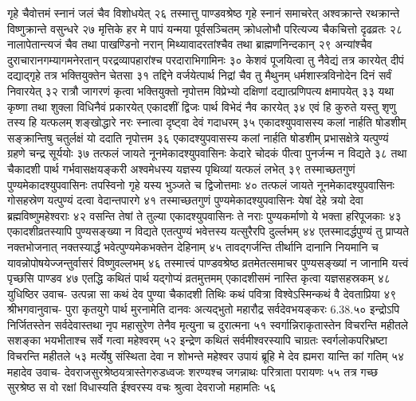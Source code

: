 गृहे चैवोत्तमं स्नानं जलं चैव विशोधयेत् २६
तस्मात्तु पाण्डवश्रेष्ठ गृहे स्नानं समाचरेत् 
अश्वक्रान्ते रथक्रान्ते विष्णुक्रान्ते वसुन्धरे २७
मृत्तिके हर मे पापं यन्मया पूर्वसञ्चितम् 
क्रोधलोभौ परित्यज्य चैकचित्तो दृढव्रतः २८
नालापेतान्त्यजं चैव तथा पाखण्डिनो नरान् 
मिथ्यावादरतांश्चैव तथा ब्राह्मणनिन्दकान् २९
अन्यांश्चैव दुराचारानगम्यागमनेरतान् 
परद्रव्यापहारांश्च परदाराभिगामिनः ३०
केशवं पूजयित्वा तु नैवेद्यं तत्र कारयेत् 
दीपं दद्याद्गृहे तत्र भक्तियुक्तेन चेतसा ३१
तद्दिने वर्जयेत्पार्थ निद्रां चैव तु मैथुनम् 
धर्मशास्त्रविनोदेन दिनं सर्वं निवारयेत् ३२
रात्रौ जागरणं कृत्वा भक्तियुक्तो नृपोत्तम 
विप्रेभ्यो दक्षिणां दद्यात्प्रणिपत्य क्षमापयेत् ३३
यथा कृष्णा तथा शुक्ला विधिनैवं प्रकारयेत् 
एकादशीं द्विजः पार्थ विभेदं नैव कारयेत् ३४
एवं हि कुरुते यस्तु शृणु तस्य हि यत्फलम् 
शङ्खोद्धारे नरः स्नात्वा दृष्ट्वा देवं गदाधरम् ३५
एकादश्युपवासस्य कलां नार्हति षोडशीम् 
सङ्क्रान्तिषु चतुर्लक्षं यो ददाति नृपोत्तम ३६
एकादश्युपवासस्य कलां नार्हति षोडशीम् 
प्रभासक्षेत्रे यत्पुण्यं ग्रहणे चन्द्र सूर्ययोः ३७
तत्फलं जायते नूनमेकादश्युपवासिनः 
केदारे चोदकं पीत्वा पुनर्जन्म न विद्यते ३८
तथा चैकादशी पार्थ गर्भवासक्षयङ्करी 
अश्वमेधस्य यज्ञस्य पृथिव्यां यत्फलं लभेत् ३९
तस्माच्छतगुणं पुण्यमेकादश्युपवासिनः 
तपस्विनो गृहे यस्य भुञ्जते च द्विजोत्तमाः ४०
तत्फलं जायते नूनमेकादश्युपवासिनः 
गोसहस्रेण यत्पुण्यं दत्वा वेदान्तपारगे ४१
तस्माच्छतगुणं पुण्यमेकादश्युपवासिनः 
येषां देहे त्रयो देवा ब्रह्मविष्णुमहेश्वराः ४२
वसन्ति तेषां ते तुल्या एकादश्युपवासिनः 
ते नराः पुण्यकर्माणो ये भक्ता हरिपूजकाः ४३
एकादशीव्रतस्यापि पुण्यसङ्ख्या न विद्यते 
एतत्पुण्यं भवेत्तस्य यत्सुरैरपि दुर्ल्लभम् ४४
एतस्मादर्द्धपुण्यं तु प्राप्यते नक्तभोजनात् 
नक्तस्यार्द्धं भवेत्पुण्यमेकभक्तेन देहिनाम् ४५
तावद्गर्जन्ति तीर्थानि दानानि नियमानि च 
यावन्नोपोषयेज्जन्तुर्वासरं विष्णुवल्लभम् ४६
तस्मात्त्वं पाण्डवश्रेष्ठ व्रतमेतत्समाचर 
पुण्यसङ्ख्यां न जानामि यत्त्वं पृच्छसि पाण्डव ४७
एतद्धि कथितं पार्थ यद्गोप्यं व्रतमुत्तमम् 
एकादशीसमं नास्ति कृत्वा यज्ञसहस्रकम् ४८
युधिष्ठिर उवाच-
उत्पन्ना सा कथं देव पुण्या चैकादशी तिथिः 
कथं पवित्रा विश्वेऽस्मिन्कथं वै देवताप्रिया ४९
श्रीभगवानुवाच-
पुरा कृतयुगे पार्थ मुरनामेति दानवः 
अत्यद्भुतो महारौद्र सर्वदेवभयङ्करः 6.38.५०
इन्द्रोऽपि निर्जितस्तेन सर्वदेवास्तथा नृप 
महासुरेण तेनैव मृत्युना च दुरात्मना ५१
स्वर्गान्निराकृतास्तेन विचरन्ति महीतले 
सशङ्का भयभीताश्च सर्वे गत्वा महेश्वरम् ५२
इन्द्रेण कथितं सर्वमीश्वरस्यापि चाग्रतः 
स्वर्गलोकपरिभ्रष्टा विचरन्ति  महीतले ५३
मर्त्येषु संस्थिता देवा न शोभन्ते महेश्वर 
उपायं ब्रूहि मे देव ह्यमरा यान्ति कां गतिम् ५४
महादेव उवाच-
देवराजसुरश्रेष्ठयत्रास्तेगरुडध्वजः 
शरण्यश्च जगन्नाथः परित्राता परायणः ५५
तत्र गच्छ सुरश्रेष्ठ स वो रक्षां विधास्यति 
ईश्वरस्य वचः श्रुत्वा देवराजो महामतिः ५६                          
